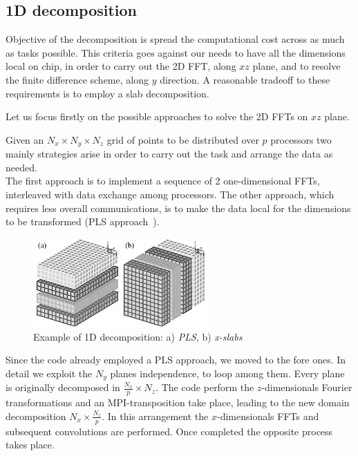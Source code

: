 \subsection{1D decomposition}
Objective of the decomposition is spread the computational cost across as much as tasks possible. This criteria goes against our needs to have all the dimensions local on chip, in order to carry out the 2D FFT, along $xz$ plane, and to resolve the finite difference scheme, along $y$ direction.
A reasonable tradeoff to these requirements is to employ a slab decomposition. 
\par
Let us focus firstly on the possible approaches to solve the 2D FFTs on $xz$ plane.\par
Given an $N_{x}\times N_{y}\times N_{z}$ grid of points to be distributed over $p$ processors two mainly strategies arise in order to carry out the task and arrange the data as needed.\\
The first approach is to implement a sequence of 2 one-dimensional FFTs, interleaved with data exchange among processors. The other approach, which requires less overall communications, is to make the data local for the dimensions to be transformed (PLS approach~\cite{cpl:presentazione}). \\
\begin{figure}
\begin{center}
\includegraphics[width=0.6\textwidth]{grafici/1d_decomp}
\caption{Example of 1D decomposition: a) \emph{PLS},  b) \emph{x-slabs}}
\label{1d:decomp}
\end{center}
\end{figure}
\par
Since the code already employed a PLS approach, we moved to the fore ones. In detail we exploit the $N_{y}$ planes independence, to loop among them. Every plane is originally decomposed in $\frac{N_{x}}{p}\times N_{z}$. The code perform the $z$-dimensionals Fourier transformations and an MPI-transposition take place, leading to the new domain decomposition $N_{x} \times \frac{N_{z}}{p}$. In this arrangement the $x$-dimensionals FFTs and subsequent convolutions are performed. Once completed the opposite process takes place. 
